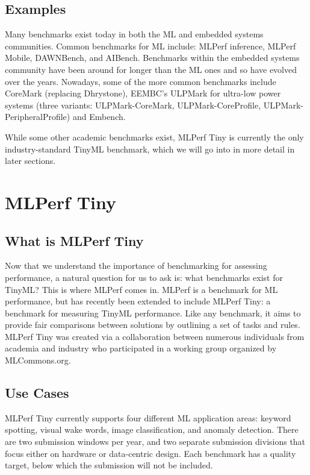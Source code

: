 {{{{{{{{    \subsection{Examples}
    Many benchmarks exist today in both the ML and embedded systems communities. Common benchmarks for ML include: MLPerf inference, MLPerf Mobile, DAWNBench, and AIBench. Benchmarks within the embedded systems community have been around for longer than the ML ones and so have evolved over the years. Nowadays, some of the more common benchmarks include CoreMark (replacing Dhrystone), EEMBC’s ULPMark for ultra-low power systems (three variants: ULPMark-CoreMark, ULPMark-CoreProfile, ULPMark-PeripheralProfile) and Embench.
    
    While some other academic benchmarks exist, MLPerf Tiny is currently the only industry-standard TinyML benchmark, which we will go into in more detail in later sections.
    
\section{MLPerf Tiny}

\subsection{What is MLPerf Tiny}

    Now that we understand the importance of benchmarking for assessing performance, a natural question for us to ask is: what benchmarks exist for TinyML? This is where MLPerf comes in. MLPerf is a benchmark for ML performance, but has recently been extended to include MLPerf Tiny: a benchmark for measuring TinyML performance. Like any benchmark, it aims to provide fair comparisons between solutions by outlining a set of tasks and rules. MLPerf Tiny was created via a collaboration between numerous individuals from academia and industry who participated in a working group organized by MLCommons.org.
    
    \subsection{Use Cases}
    
    MLPerf Tiny currently supports four different ML application areas: keyword spotting, visual wake words, image classification, and anomaly detection. There are two submission windows per year, and two separate submission divisions that focus either on hardware or data-centric design. Each benchmark has a quality target, below which the submission will not be included.
    
}}}}}}}}
